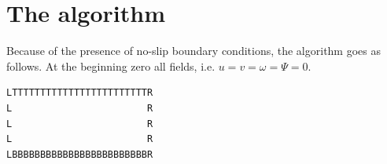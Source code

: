 \section*{The algorithm}




Because of the presence of no-slip boundary conditions, the algorithm goes as follows. 
At the beginning zero all fields, i.e. $u=v=\omega=\Psi=0$.

\begin{center}
\begin{verbatim}
LTTTTTTTTTTTTTTTTTTTTTTTTR
L                        R
L                        R 
L                        R 
LBBBBBBBBBBBBBBBBBBBBBBBBR
\end{verbatim}
\end{center}

